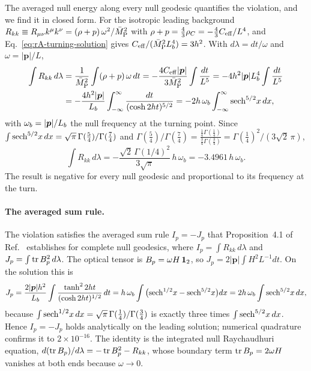 The averaged null energy along every null geodesic quantifies the violation, and we find it in closed form.
For the isotropic leading background $R_{kk}\equiv R_{\mu\nu}k^\mu k^\nu=(\rho+p)\,\omega^2/\bar M_{\mathrm{P}}^2$ with $\rho+p=\tfrac43\rho_C=-\tfrac43C_{\rm eff}/L^4$, and Eq.~\eqref{eq:rA-turning-solution} gives $C_{\rm eff}/(\bar M_{\mathrm{P}}^2L_b^4)=3h^2$.
With $d\lambda=dt/\omega$ and $\omega=|\bm p|/L$,
\begin{equation}
\begin{aligned}
\int R_{kk}\,d\lambda&=\frac{1}{\bar M_{\mathrm{P}}^2}\int(\rho+p)\,\omega\,dt=-\frac{4C_{\rm eff}|\bm p|}{3\bar M_{\mathrm{P}}^2}\int\frac{dt}{L^5}=-4h^2|\bm p|L_b^4\int\frac{dt}{L^5}\\
&=-\frac{4h^2|\bm p|}{L_b}\int_{-\infty}^{\infty}\frac{dt}{(\cosh2ht)^{5/2}}=-2h\,\omega_b\int_{-\infty}^{\infty}{\rm sech}^{5/2}x\,dx,
\end{aligned}
\label{eq:rA-anec-integral}
\end{equation}
with $\omega_b=|\bm p|/L_b$ the null frequency at the turning point.
Since $\int{\rm sech}^{5/2}x\,dx=\sqrt\pi\,\Gamma(\tfrac54)/\Gamma(\tfrac74)$ and $\Gamma(\tfrac54)/\Gamma(\tfrac74)=\tfrac{\frac14\Gamma(\frac14)}{\frac34\Gamma(\frac34)}=\Gamma(\tfrac14)^2/(3\sqrt2\,\pi)$,
\begin{equation}
\int R_{kk}\,d\lambda=-\frac{\sqrt2\,\Gamma(1/4)^2}{3\sqrt\pi}\,h\,\omega_b=-3.4961\,h\,\omega_b . %
\label{eq:rA-anec}
\end{equation}
The result is negative for every null geodesic and proportional to its frequency at the turn.

\paragraph{The averaged sum rule.}
The violation satisfies the averaged sum rule $I_p=-J_p$ that Proposition~4.1 of Ref.~\cite{Zhou:2026szo} establishes for complete null geodesics, where $I_p=\int R_{kk}\,d\lambda$ and $J_p=\int\operatorname{tr} B_p^2\,d\lambda$.
The optical tensor is $B_p=\omega H\,\mathbf{1}_2$, so $J_p=2|\bm p|\int H^2L^{-1}dt$.
On the solution this is
\begin{equation}
J_p=\frac{2|\bm p|h^2}{L_b}\int\frac{\tanh^22ht}{(\cosh2ht)^{1/2}}\,dt=h\,\omega_b\int\big({\rm sech}^{1/2}x-{\rm sech}^{5/2}x\big)dx=2h\,\omega_b\int{\rm sech}^{5/2}x\,dx,
\end{equation}
because $\int{\rm sech}^{1/2}x\,dx=\sqrt\pi\,\Gamma(\tfrac14)/\Gamma(\tfrac34)$ is exactly three times $\int{\rm sech}^{5/2}x\,dx$.
Hence $I_p=-J_p$ holds analytically on the leading solution; numerical quadrature confirms it to $2\times10^{-16}$. %
The identity is the integrated null Raychaudhuri equation, $d(\operatorname{tr} B_p)/d\lambda=-\operatorname{tr} B_p^2-R_{kk}$, whose boundary term $\operatorname{tr} B_p=2\omega H$ vanishes at both ends because $\omega\to0$.

